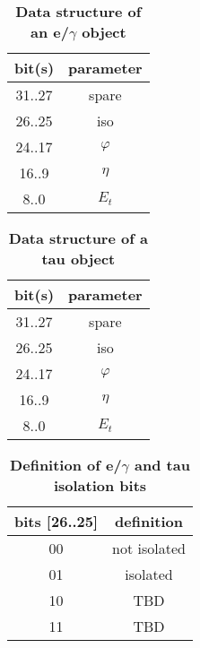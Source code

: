 \documentclass{cmspaper}
\begin{document}
\begin{table}[ht]
\caption{\bf Data structure of an e/$\gamma$ object}
\vspace{5mm}
\centering
\begin{tabular}{|c|c|}\hline
bit(s) & parameter \\\hline\hline
31..27 & spare \\
26..25 & iso \\
24..17 & $\varphi$ \\
16..9 & $\eta$ \\
8..0 & $E_t$ \\\hline
\end{tabular}
\label{table:egamma_object}
\end{table}

\begin{table}[ht]
\caption{\bf Data structure of a tau object}
\vspace{5mm}
\centering
\begin{tabular}{|c|c|}\hline
bit(s) & parameter \\\hline\hline
31..27 & spare \\
26..25 & iso \\
24..17 & $\varphi$ \\
16..9 & $\eta$ \\
8..0 & $E_t$ \\\hline
\end{tabular}
\label{table:tau_object}
\end{table}

\begin{table}[ht]
\caption{\bf Definition of e/$\gamma$ and tau isolation bits}
\vspace{5mm}
\centering
\begin{tabular}{|c|c|}\hline
bits [26..25] & definition \\\hline\hline
00 & not isolated \\
01 & isolated \\
10 & TBD \\
11 & TBD \\\hline
\end{tabular}
\label{table:eg_tau_iso_bits}
\end{table}
\end{document}
